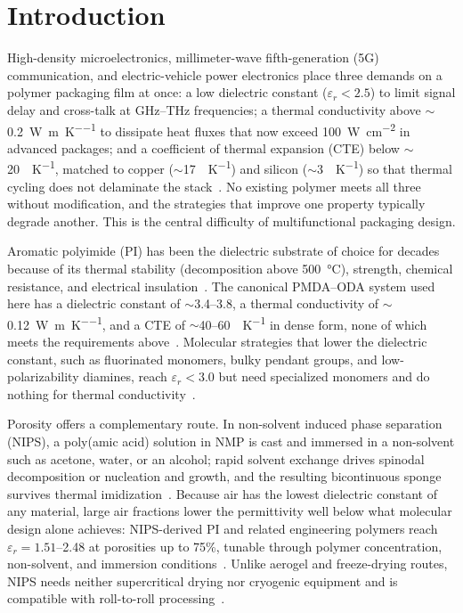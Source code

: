 \documentclass[preprint,a4paper]{elsarticle}
\newcommand{\eps}{\ensuremath{\varepsilon_r}}   %
\begin{document}
\renewcommand{\figurename}{Figure}

\newpage
\section{Introduction}
\label{sec:intro}

High-density microelectronics, millimeter-wave fifth-generation (5G) communication, and electric-vehicle power electronics place three demands on a polymer packaging film at once: a low dielectric constant ($\eps < 2.5$) to limit signal delay and cross-talk at GHz--THz frequencies; a thermal conductivity above $\sim$\SI{0.2}{\watt\per\meter\per\kelvin} to dissipate heat fluxes that now exceed \SI{100}{\watt\per\centi\meter\squared} in advanced packages; and a coefficient of thermal expansion (CTE) below $\sim$\SI{20}{\ppm\per\kelvin}, matched to copper ($\sim$\SI{17}{\ppm\per\kelvin}) and silicon ($\sim$\SI{3}{\ppm\per\kelvin}) so that thermal cycling does not delaminate the stack~\cite{li2022review,liu2022hightemp,li2023fluorinated}. No existing polymer meets all three without modification, and the strategies that improve one property typically degrade another. This is the central difficulty of multifunctional packaging design.

Aromatic polyimide (PI) has been the dielectric substrate of choice for decades because of its thermal stability (decomposition above \SI{500}{\celsius}), strength, chemical resistance, and electrical insulation~\cite{guo2022hierarchical}. The canonical PMDA--ODA system used here has a dielectric constant of $\sim$3.4--3.8, a thermal conductivity of $\sim$\SI{0.12}{\watt\per\meter\per\kelvin}, and a CTE of $\sim$40--\SI{60}{\ppm\per\kelvin} in dense form, none of which meets the requirements above~\cite{tan2022facile}. Molecular strategies that lower the dielectric constant, such as fluorinated monomers, bulky pendant groups, and low-polarizability diamines, reach $\eps < 3.0$ but need specialized monomers and do nothing for thermal conductivity~\cite{li2024preparation,li2023sustainable}.

Porosity offers a complementary route. In non-solvent induced phase separation (NIPS), a poly(amic acid) solution in NMP is cast and immersed in a non-solvent such as acetone, water, or an alcohol; rapid solvent exchange drives spinodal decomposition or nucleation and growth, and the resulting bicontinuous sponge survives thermal imidization~\cite{kim2022polymer,khim2023temperature,kim2017continuous}. Because air has the lowest dielectric constant of any material, large air fractions lower the permittivity well below what molecular design alone achieves: NIPS-derived PI and related engineering polymers reach $\eps = 1.51$--2.48 at porosities up to 75\%, tunable through polymer concentration, non-solvent, and immersion conditions~\cite{li2023sustainable,li2024carbon,ren2023structuring}. Unlike aerogel and freeze-drying routes, NIPS needs neither supercritical drying nor cryogenic equipment and is compatible with roll-to-roll processing~\cite{zhao2023fatigue}.
\end{document}
